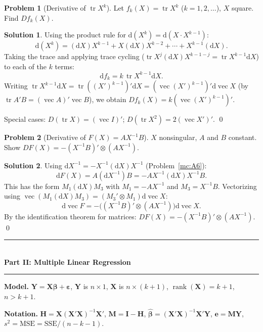 \documentclass[12pt,a4paper]{article}
\theoremstyle{definition}
\newtheorem{exercise}{Problem}
\newtheorem*{solution*}{Solution}
\DeclareMathOperator\tr{tr}
\DeclareMathOperator\rank{rank}
\DeclareMathOperator{\avec}{vec}
\newcommand{\dd}{\mathrm{d}}
\newcommand{\SSE}{\mathrm{SSE}}
\newcommand{\MSE}{\mathrm{MSE}}
\newcommand{\bX}{\mathbf{X}}
\newcommand{\bY}{\mathbf{Y}}
\def\bb{\boldsymbol{\beta}}
\newcommand{\be}{\boldsymbol{\varepsilon}}
\newcommand{\bI}{\mathbf{I}}
\newcommand{\bH}{\mathbf{H}}
\newcommand{\bM}{\mathbf{M}}
\begin{document}
\begin{exercise}[Derivative of $\tr X^k$]\label{mc:B5}
Let $f_k(X) = \tr X^k$ ($k = 1, 2, \ldots$), $X$ square. Find $Df_k(X)$.
\end{exercise}

\begin{solution*}
Using the product rule for $\dd(X^k) = \dd(X \cdot X^{k-1})$:
\[
\dd(X^k) = (\dd X)X^{k-1} + X(\dd X)X^{k-2} + \cdots + X^{k-1}(\dd X).
\]
Taking the trace and applying trace cycling ($\tr X^j(\dd X)X^{k-1-j} = \tr X^{k-1}\dd X$) to each of the $k$ terms:
\[
\dd f_k = k\,\tr X^{k-1}\dd X.
\]
Writing $\tr X^{k-1}\dd X = \tr((X')^{k-1})'\dd X = (\avec (X')^{k-1})'\dd\avec X$ (by $\tr A'B = (\avec A)'\avec B$), we obtain $Df_k(X) = k(\avec (X')^{k-1})'$.

Special cases: $D(\tr X) = (\avec I)'$; \; $D(\tr X^2) = 2(\avec X')'$. \qed
\end{solution*}

\begin{exercise}[Derivative of $F(X) = AX^{-1}B$]\label{mc:B6}
$X$ nonsingular, $A$ and $B$ constant. Show $DF(X) = -(X^{-1}B)' \otimes (AX^{-1})$.
\end{exercise}

\begin{solution*}
Using $\dd X^{-1} = -X^{-1}(\dd X)X^{-1}$ (Problem~\ref{mc:A6}):
\[
\dd F(X) = A(\dd X^{-1})B = -AX^{-1}(\dd X)X^{-1}B.
\]
This has the form $M_1(\dd X)M_3$ with $M_1 = -AX^{-1}$ and $M_3 = X^{-1}B$. Vectorizing using $\avec(M_1(\dd X)M_3) = (M_3' \otimes M_1)\dd\avec X$:
\[
\dd\avec F = -\bigl((X^{-1}B)' \otimes (AX^{-1})\bigr)\dd\avec X.
\]
By the identification theorem for matrices: $DF(X) = -(X^{-1}B)' \otimes (AX^{-1})$. \qed
\end{solution*}


\bigskip
\begin{center}
\rule{0.6\textwidth}{0.4pt}\\[2mm]
{\Large\bfseries Part II: Multiple Linear Regression}\\[1mm]
\rule{0.6\textwidth}{0.4pt}
\end{center}

\medskip
\noindent\textbf{Model.}\; $\bY = \bX\bb + \be$, $\bY$ is $n \times 1$, $\bX$ is $n \times (k+1)$, $\rank(\bX) = k+1$, $n > k+1$.

\noindent\textbf{Notation.}\; $\bH = \bX(\bX'\bX)^{-1}\bX'$, $\bM = \bI - \bH$, $\hat{\bb} = (\bX'\bX)^{-1}\bX'\bY$, $\mathbf{e} = \bM\bY$, $s^2 = \MSE = \SSE/(n{-}k{-}1)$.
\end{document}
